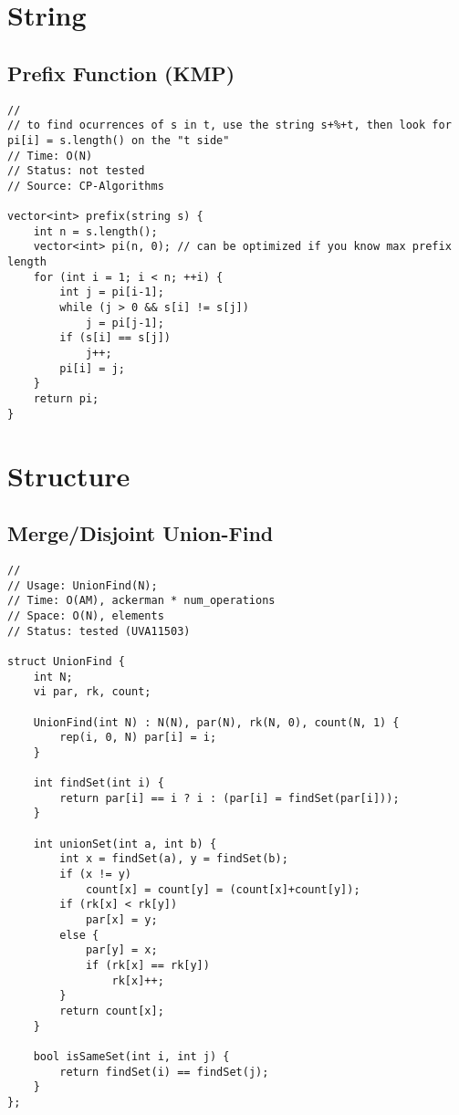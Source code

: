 \documentclass[12pt, a4paper, twoside]{article}
\begin{document}

\section{String}

\subsection{Prefix Function (KMP)}
\begin{lstlisting}
//
// to find ocurrences of s in t, use the string s+%+t, then look for pi[i] = s.length() on the "t side"
// Time: O(N)
// Status: not tested
// Source: CP-Algorithms

vector<int> prefix(string s) {
	int n = s.length();
	vector<int> pi(n, 0); // can be optimized if you know max prefix length
	for (int i = 1; i < n; ++i) {
		int j = pi[i-1];
		while (j > 0 && s[i] != s[j])
			j = pi[j-1];
		if (s[i] == s[j])
			j++;
		pi[i] = j;
	}
	return pi;
}
\end{lstlisting}



\section{Structure}

\subsection{Merge/Disjoint Union-Find}
\begin{lstlisting}
//
// Usage: UnionFind(N);
// Time: O(AM), ackerman * num_operations
// Space: O(N), elements
// Status: tested (UVA11503)

struct UnionFind {
	int N;
	vi par, rk, count;

	UnionFind(int N) : N(N), par(N), rk(N, 0), count(N, 1) {
		rep(i, 0, N) par[i] = i;
	}

	int findSet(int i) {
		return par[i] == i ? i : (par[i] = findSet(par[i]));
	}

	int unionSet(int a, int b) {
		int x = findSet(a), y = findSet(b);
		if (x != y)
			count[x] = count[y] = (count[x]+count[y]);
		if (rk[x] < rk[y])
			par[x] = y;
		else {
			par[y] = x;
			if (rk[x] == rk[y])
				rk[x]++;
		}
		return count[x];
	}

	bool isSameSet(int i, int j) {
		return findSet(i) == findSet(j);
	}
};
\end{lstlisting}
\end{document}
